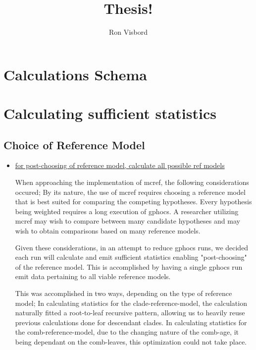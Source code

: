 \documentclass[10pt,a4paper]{article}
\author{Ron Visbord}
\title{Thesis!}
\begin{document}
\maketitle


\section{Calculations Schema}



\section{Calculating sufficient statistics}
\subsection{Choice of Reference Model}
\begin{itemize}
\item \underline{for post-choosing of reference model, calculate all possible ref models}

When approaching the implementation of mcref, the following considerations occured; By its nature, the use of mcref requires choosing a reference model that is best suited for comparing the competing hypotheses. Every hypothesis being weighted requires a long execution of gphocs. A researcher utilizing mcref may wish to compare between many candidate hypotheses and may wish to obtain comparisons based on many reference models.

Given these considerations, in an attempt to reduce gphocs runs, we decided each run will calculate and emit sufficient statistics enabling "post-choosing" of the reference model. This is accomplished by having a single gphocs run emit data pertaining to all viable reference models.

This was accomplished in two ways, depending on the type of reference model; In calculating statistics for the clade-reference-model, the calculation naturally fitted a root-to-leaf recursive pattern, allowing us to heavily reuse previous calculations done for descendant clades. In calculating statistics for the comb-reference-model, due to the changing nature of the comb-age, it being dependant on the comb-leaves, this optimization could not take place.

\end{itemize}
\end{document}
